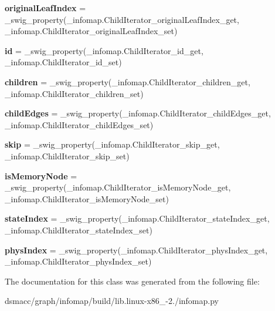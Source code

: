 \begin{DoxyCompactItemize}
{\bfseries original\+Leaf\+Index} = \+\_\+swig\+\_\+property(\+\_\+infomap.\+Child\+Iterator\+\_\+original\+Leaf\+Index\+\_\+get, \+\_\+infomap.\+Child\+Iterator\+\_\+original\+Leaf\+Index\+\_\+set)
\item 
\mbox{\label{classinfomap_1_1ChildIterator_a9d4fa9abc9f7c493834aa344f0f581b7}} 
{\bfseries id} = \+\_\+swig\+\_\+property(\+\_\+infomap.\+Child\+Iterator\+\_\+id\+\_\+get, \+\_\+infomap.\+Child\+Iterator\+\_\+id\+\_\+set)
\item 
\mbox{\label{classinfomap_1_1ChildIterator_adcd4cddea2bec443791f4e4a23c600e0}} 
{\bfseries children} = \+\_\+swig\+\_\+property(\+\_\+infomap.\+Child\+Iterator\+\_\+children\+\_\+get, \+\_\+infomap.\+Child\+Iterator\+\_\+children\+\_\+set)
\item 
\mbox{\label{classinfomap_1_1ChildIterator_a170d865543c188c3f3ab1f3272b56ae3}} 
{\bfseries child\+Edges} = \+\_\+swig\+\_\+property(\+\_\+infomap.\+Child\+Iterator\+\_\+child\+Edges\+\_\+get, \+\_\+infomap.\+Child\+Iterator\+\_\+child\+Edges\+\_\+set)
\item 
\mbox{\label{classinfomap_1_1ChildIterator_ac579e9cc9190f8edae888e7d8d2770a4}} 
{\bfseries skip} = \+\_\+swig\+\_\+property(\+\_\+infomap.\+Child\+Iterator\+\_\+skip\+\_\+get, \+\_\+infomap.\+Child\+Iterator\+\_\+skip\+\_\+set)
\item 
\mbox{\label{classinfomap_1_1ChildIterator_a87258c5027181ee4ba283a85ee998ec1}} 
{\bfseries is\+Memory\+Node} = \+\_\+swig\+\_\+property(\+\_\+infomap.\+Child\+Iterator\+\_\+is\+Memory\+Node\+\_\+get, \+\_\+infomap.\+Child\+Iterator\+\_\+is\+Memory\+Node\+\_\+set)
\item 
\mbox{\label{classinfomap_1_1ChildIterator_a817b122bc0b260cd1c6a9765e24045a8}} 
{\bfseries state\+Index} = \+\_\+swig\+\_\+property(\+\_\+infomap.\+Child\+Iterator\+\_\+state\+Index\+\_\+get, \+\_\+infomap.\+Child\+Iterator\+\_\+state\+Index\+\_\+set)
\item 
\mbox{\label{classinfomap_1_1ChildIterator_ac17683684ca3bc68d443913a13c45401}} 
{\bfseries phys\+Index} = \+\_\+swig\+\_\+property(\+\_\+infomap.\+Child\+Iterator\+\_\+phys\+Index\+\_\+get, \+\_\+infomap.\+Child\+Iterator\+\_\+phys\+Index\+\_\+set)
\end{DoxyCompactItemize}


The documentation for this class was generated from the following file\+:\begin{DoxyCompactItemize}
\item 
dsmacc/graph/infomap/build/lib.\+linux-\/x86\+\_-\/2./infomap.\+py\end{DoxyCompactItemize}
